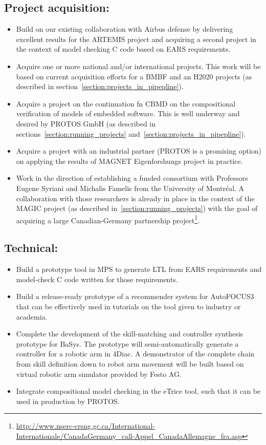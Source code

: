\documentclass{article}
\begin{document}
\begin{appendices}
\subsection{Project acquisition:}

\begin{itemize}
  \item Build on our existing collaboration with Airbus defense by delivering
  excellent results for the ARTEMIS project and acquiring a second project in
  the context of model checking C code based on EARS requirements.
  \item Acquire one or more national and/or international projects. This work
  will be based on current acquisition efforts for a BMBF and an H2020 projects
  (as described in section~\ref{section:projects_in_pipepline}).
  \item Acquire a project on the continuation fn CBMD on the compositional
  verification of models of embedded software. This is well underway and desired
  by PROTOS GmbH (as described in sections~\ref{section:running_projects}
  and~\ref{section:projects_in_pipepline}).
  \item Acquire a project with an industrial partner (PROTOS is a promising
  option) on applying the results of MAGNET Eigenforshungs project in practice.
  \item Work in the direction of establishing a funded consortium with
  Professors Eugene Syriani and Michalis Famelis from the University of
  Montr\'eal. A collaboration with those researchers is already in place in the
  context of the MAGIC project (as described in~\ref{section:running_projects}) with the goal of acquiring a
  large Canadian-Germany partnership
  project\footnote{\url{http://www.nserc-crsng.gc.ca/International-Internationale/CanadaGermany_call-Appel_CanadaAllemagne_fra.asp}}.
\end{itemize}

\subsection{Technical:}

\begin{itemize}
  \item Build a prototype tool in MPS to generate LTL from EARS requirements and
  model-check C code written for those requirements. 
  \item Build a release-ready prototype of a recommender system for AutoFOCUS3
  that can be effectively used in tutorials on the tool given to industry or
  academia.
  \item Complete the development of the skill-matching and controller
  synthesis prototype for BaSys. The prototype will semi-automatically generate
  a controller for a robotic arm in 4Diac. A demonstrator of the complete chain
  from skill definition down to robot arm movement will be built based on
  virtual robotic arm simulator provided by Festo AG. 
  \item Integrate compositional model checking in the eTrice tool, such that it
  can be used in production by PROTOS.
\end{itemize}


\end{appendices}
\end{document}
